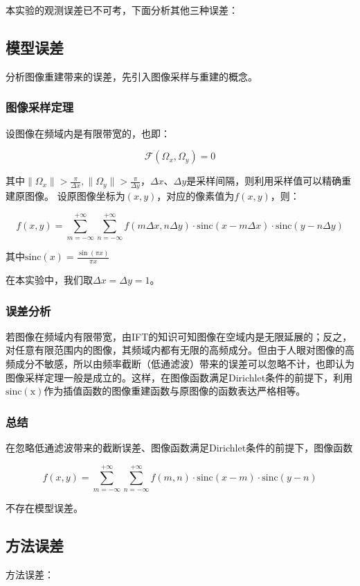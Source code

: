 \documentclass{article}
\begin{document}
\noindent 本实验的观测误差已不可考，下面分析其他三种误差：

\subsection{模型误差}
分析图像重建带来的误差，先引入图像采样与重建的概念。

\subsubsection{图像采样定理}
设图像在频域内是有限带宽的，也即：

$$\mathcal{F}(\Omega_x,\Omega_y) = 0$$

其中$\| \Omega_x \| > \frac{\pi}{\Delta x}, \| \Omega_y \| > \frac{\pi}{\Delta y}$，$\Delta x$、$\Delta y$是采样间隔，则利用采样值可以精确重建原图像。 设原图像坐标为$(x,y)$，对应的像素值为$f(x,y)$，则：

$$f(x,y) = \sum_{m=-\infty}^{+\infty}\sum_{n=-\infty}^{+\infty}f(m\Delta x,n\Delta y)\cdot \mathrm{sinc}(x-m\Delta x)\cdot \mathrm{sinc}(y-n\Delta y)$$

其中$\mathrm{sinc}(x) = \frac{\sin(\pi x)}{\pi x}$

在本实验中，我们取$\Delta x = \Delta y = 1$。

\subsubsection{误差分析}
若图像在频域内有限带宽，由IFT的知识可知图像在空域内是无限延展的；反之，对任意有限范围内的图像，其频域内都有无限的高频成分。但由于人眼对图像的高频成分不敏感，所以由频率截断（低通滤波）带来的误差可以忽略不计，也即认为图像采样定理一般是成立的。这样，在图像函数满足Dirichlet条件的前提下，利用$\mathrm{sinc(x)}$作为插值函数的图像重建函数与原图像的函数表达严格相等。

\subsubsection{总结}
在忽略低通滤波带来的截断误差、图像函数满足Dirichlet条件的前提下，图像函数

$$f(x,y) = \sum_{m=-\infty}^{+\infty}\sum_{n=-\infty}^{+\infty}f(m,n)\cdot \mathrm{sinc}(x-m)\cdot \mathrm{sinc}(y-n)$$

不存在模型误差。

\subsection{方法误差}
方法误差：
\end{document}
